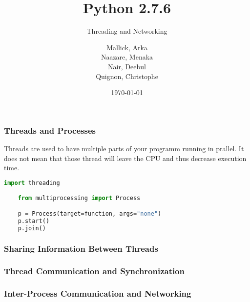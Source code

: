 \documentclass{beamer}
\begin{document}
\title{Python 2.7.6}
\subtitle{Threading and Networking}
\author{
  Mallick, Arka\\
  Naazare, Menaka \\
  Nair, Deebul\\
  Quignon, Christophe \\
} 
\date{\today}

\begin{frame}
\titlepage
\end{frame}

\begin{frame}[fragile]
\frametitle{Threads and Processes}
Threads are used to have multiple parts of your programm running in prallel. It does not mean that those thread will leave the CPU and thus decrease execution time.


\begin{lstlisting}[language=Python]
import threading

	from multiprocessing import Process

    p = Process(target=function, args="none")
    p.start()
    p.join()
\end{lstlisting}


\end{frame}


\begin{frame}[fragile]
\frametitle{Sharing Information Between Threads}

\end{frame}


\begin{frame}[fragile]
\frametitle{Thread Communication and Synchronization}

\end{frame}


\begin{frame}[fragile]
\frametitle{Inter-Process Communication and Networking}

\end{frame}

	
\end{document}
